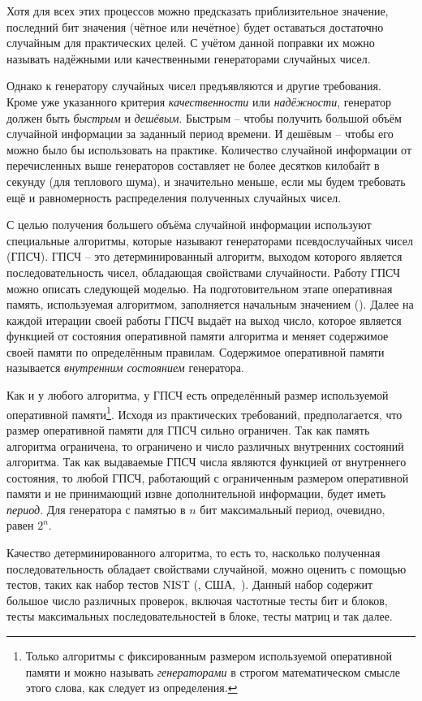 Хотя для всех этих процессов можно предсказать приблизительное значение, последний бит значения (чётное или нечётное) будет оставаться достаточно случайным для практических целей. С учётом данной поправки их можно называть надёжными или качественными генераторами случайных чисел.

Однако к генератору случайных чисел предъявляются и другие требования. Кроме уже указанного критерия \emph{качественности} или \emph{надёжности}, генератор должен быть \emph{быстрым} и \emph{дешёвым}. Быстрым -- чтобы получить большой объём случайной информации за заданный период времени. И дешёвым -- чтобы его можно было бы использовать на практике. Количество случайной информации от перечисленных выше генераторов составляет не более десятков килобайт в секунду (для теплового шума), и значительно меньше, если мы будем требовать ещё и равномерность распределения полученных случайных чисел.

С целью получения большего объёма случайной информации используют специальные алгоритмы, которые называют генераторами псевдослучайных чисел (ГПСЧ). ГПСЧ -- это детерминированный алгоритм, выходом которого является последовательность чисел, обладающая свойствами случайности. Работу ГПСЧ можно описать следующей моделью. На подготовительном этапе оперативная память, используемая алгоритмом, заполняется начальным значением (). Далее на каждой итерации своей работы ГПСЧ выдаёт на выход число, которое является функцией от состояния оперативной памяти алгоритма и меняет содержимое своей памяти по определённым правилам. Содержимое оперативной памяти называется \emph{внутренним состоянием} генератора.

Как и у любого алгоритма, у ГПСЧ есть определённый размер используемой оперативной памяти\footnote{Только алгоритмы с фиксированным размером используемой оперативной памяти и можно называть \emph{генераторами} в строгом математическом смысле этого слова, как следует из определения.}. Исходя из практических требований, предполагается, что размер оперативной памяти для ГПСЧ сильно ограничен. Так как память алгоритма ограничена, то ограничено и число различных внутренних состояний алгоритма. Так как выдаваемые ГПСЧ числа являются функцией от внутреннего состояния, то любой ГПСЧ, работающий с ограниченным размером оперативной памяти и не принимающий извне дополнительной информации, будет иметь \emph{период}. Для генератора с памятью в $n$ бит максимальный период, очевидно, равен $2^n$.

Качество детерминированного алгоритма, то есть то, насколько полученная последовательность обладает свойствами случайной, можно оценить с помощью тестов, таких как набор тестов NIST (, США,~\cite{NIST:2001}). Данный набор содержит большое число различных проверок, включая частотные тесты бит и блоков, тесты максимальных последовательностей в блоке, тесты матриц и так далее.

